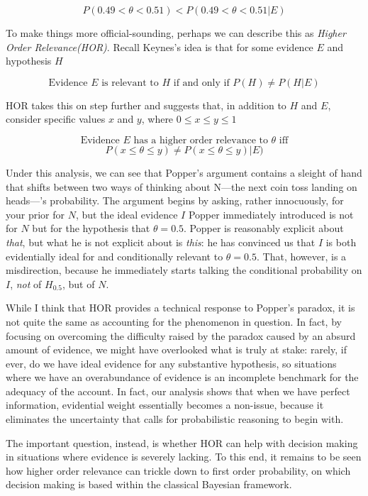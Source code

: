 \[P(0.49<\theta<0.51) <  P(0.49<\theta<0.51|E)\]

To make things more official-sounding, perhaps we can describe this as
\emph{Higher Order Relevance(HOR)}. Recall Keynes's idea is that for
some evidence \(E\) and hypothesis \(H\)

\[\text{Evidence $E$ is relevant to $H$ if and only if }P(H) \neq P(H|E)\]

HOR takes this on step further and suggests that, in addition to \(H\)
and \(E\), consider specific values \(x\) and \(y\), where
\(0 \leq x \leq y \leq 1\)

\[\text{Evidence $E$ has a higher order relevance to $\theta$ iff}\]
\[P(x\leq \theta \leq y) \neq P(x\leq \theta \leq y)|E)\]

Under this analysis, we can see that Popper's argument contains a
sleight of hand that shifts between two ways of thinking about N---the
next coin toss landing on heads---'s probability. The argument begins by
asking, rather innocuously, for your prior for \(N\), but the ideal
evidence \(I\) Popper immediately introduced is not for \(N\) but for
the hypothesis that \(\theta = 0.5\). Popper is reasonably explicit
about \emph{that}, but what he is not explicit about is \emph{this}: he
has convinced us that \(I\) is both evidentially ideal for and
conditionally relevant to \(\theta = 0.5\). That, however, is a
misdirection, because he immediately starts talking the conditional
probability on \(I\), \emph{not} of \(H_{0.5}\), but of \(N\).

While I think that HOR provides a technical response to Popper's
paradox, it is not quite the same as accounting for the phenomenon in
question. In fact, by focusing on overcoming the difficulty raised by
the paradox caused by an absurd amount of evidence, we might have
overlooked what is truly at stake: rarely, if ever, do we have ideal
evidence for any substantive hypothesis, so situations where we have an
overabundance of evidence is an incomplete benchmark for the adequacy of
the account. In fact, our analysis shows that when we have perfect
information, evidential weight essentially becomes a non-issue, because
it eliminates the uncertainty that calls for probabilistic reasoning to
begin with.

The important question, instead, is whether HOR can help with decision
making in situations where evidence is severely lacking. To this end, it
remains to be seen how higher order relevance can trickle down to first
order probability, on which decision making is based within the
classical Bayesian framework.

